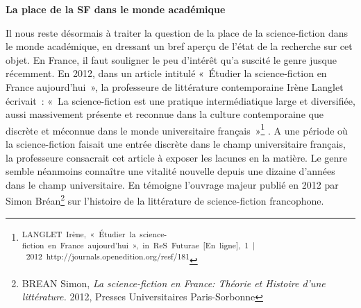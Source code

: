 \documentclass[letterpaper,portrait,12pt]{article}
\begin{document}
\textbf{	La place de la SF dans le monde acad\'{e}mique}





\emph{	}Il nous reste d\'{e}sormais \`{a} traiter la question de la place de la science-fiction dans le monde acad\'{e}mique, en dressant un bref aper\c{c}u de l'\'{e}tat de la recherche sur cet objet. En France, il faut souligner le peu d'int\'{e}r\^{e}t qu'a suscit\'{e} le genre jusque r\'{e}cemment. En 2012, dans un article intitul\'{e} « \'{E}tudier la science-fiction en France aujourd'hui », la professeure de litt\'{e}rature contemporaine Ir\`{e}ne Langlet \'{e}crivait : « La science-fiction est une pratique interm\'{e}diatique large et diversifi\'{e}e, aussi massivement pr\'{e}sente et reconnue dans la culture contemporaine que discr\`{e}te et m\'{e}connue dans le monde universitaire fran\c{c}ais »\footnote{\textsuperscript{\newpage
}\textsuperscript{	LANGLET\ Ir\`{e}ne,\ «\ \'{E}tudier\ la\ science-fiction\ en\ France\ aujourd'hui\ »,\ in\ ReS\ Futurae\ [En\ ligne],\ 1\ |\ 2012\ http://journals.openedition.org/resf/181}} . A une p\'{e}riode où la science-fiction faisait une entr\'{e}e discr\`{e}te dans le champ universitaire fran\c{c}ais, la professeure consacrait cet article \`{a} exposer les lacunes en la mati\`{e}re. Le genre semble n\'{e}anmoins conna\^{i}tre une vitalit\'{e} nouvelle depuis une dizaine d'ann\'{e}es dans le champ universitaire. En t\'{e}moigne l'ouvrage majeur publi\'{e} en 2012 par Simon Br\'{e}an\footnote{	BREAN Simon, \emph{La science-fiction en France: Th\'{e}orie et Histoire d'une litt\'{e}rature.} 2012, Presses Universitaires Paris-Sorbonne} sur l'histoire de la litt\'{e}rature de science-fiction francophone.
\end{document}
